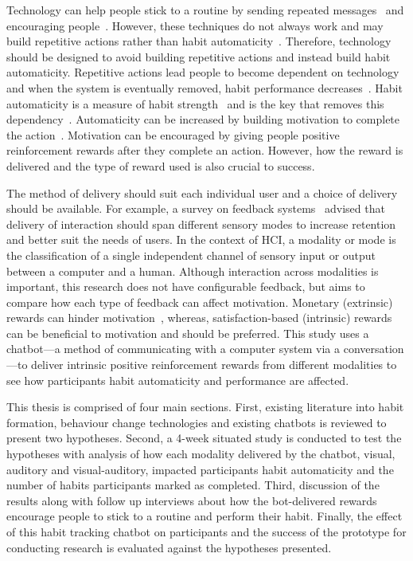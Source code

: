 Technology can help people stick to a routine by sending repeated messages~\cite{chi_crowd_designed_motivation} and encouraging people~\cite{positive_reinforcement_pro}. However, these techniques do not always work and may build repetitive actions rather than habit automaticity~\cite{coaching_not_that_good}. Therefore, technology should be designed to avoid building repetitive actions and instead build habit automaticity. Repetitive actions lead people to become dependent on technology and when the system is eventually removed, habit performance decreases~\cite{article_dont_kick_habit, article_realtime_feedback_improving_medication_taking}. Habit automaticity is a measure of habit strength~\cite{article_4q_SRBAI} and is the key that removes this dependency~\cite{article_beyond_self_tracking_designing_apps}. Automaticity can be increased by building motivation to complete the action~\cite{article_a_self_efficacy, article_meta_analytic_review_intrinsic_motivation}.
Motivation can be encouraged by giving people positive reinforcement rewards after they complete an action. However, how the reward is delivered and the type of reward used is also crucial to success.

The method of delivery should suit each individual user and a choice of delivery should be available. For example, a survey on feedback systems~\cite{article_user_centred_multimodal_reminders} advised that delivery of interaction should span different sensory modes to increase retention and better suit the needs of users. In the context of HCI, a modality or mode is the classification of a single independent channel of sensory input or output between a computer and a human. Although interaction across modalities is important, this research does not have configurable feedback, but aims to compare how each type of feedback can affect motivation. Monetary (extrinsic) rewards can hinder motivation~\cite{article_meta_analytic_review_intrinsic_motivation}, whereas, satisfaction-based (intrinsic) rewards can be beneficial to motivation and should be preferred.
This study uses a chatbot---a method of communicating with a computer system via a conversation---to deliver intrinsic positive reinforcement rewards from different modalities to see how participants habit automaticity and performance are affected.

This thesis is comprised of four main sections. First, existing literature into habit formation, behaviour change technologies and existing chatbots is reviewed to present two hypotheses. Second, a 4-week situated study is conducted to test the hypotheses with analysis of how each modality delivered by the chatbot, visual, auditory and visual-auditory, impacted participants habit automaticity and the number of habits participants marked as completed. Third, discussion of the results along with follow up interviews about how the bot-delivered rewards encourage people to stick to a routine and perform their habit. Finally, the effect of this habit tracking chatbot on participants and the success of the prototype for conducting research is evaluated against the hypotheses presented.

